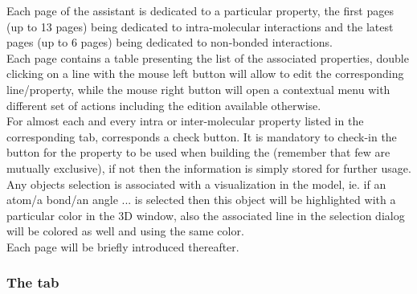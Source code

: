 Each page of the assistant is dedicated to a particular property, the first pages (up to 13 pages) being dedicated to intra-molecular interactions 
and the latest pages (up to 6 pages) being dedicated to non-bonded interactions. \\[0.25cm]
Each page contains a table presenting the list of the associated properties,
double clicking on a line with the mouse left button will allow to edit the corresponding line/property, 
while the mouse right button will open a contextual menu with different set of actions including the edition available otherwise. \\[0.25cm]
For almost each and every intra or inter-molecular property listed in the corresponding tab, corresponds a  check button. 
It is mandatory to check-in the  button for the property to be used when building the  (remember that few are mutually exclusive), 
if not then the information is simply stored for further usage. \\[0.25cm]
Any objects selection is associated with a visualization in the model, ie. if an atom/a bond/an angle ... is selected then 
this object will be highlighted with a particular color in the 3D window, also the associated line in the selection dialog will be colored as well and using the same
color. \\[0.25cm]
Each page will be briefly introduced thereafter. 

\subsubsection*{The  tab}

